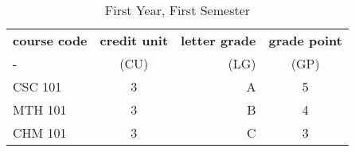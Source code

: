 \documentclass{article}
\begin{document}
	\begin{table}[h!]
	\begin{center}
	\caption {First Year, First Semester}
	\label{tab:table1}
	\begin{tabular}{l|c|r|c|}
		\textbf{course code} & \textbf{credit unit} & \textbf{letter grade} & \textbf{grade point}\\ 
	- & (CU) & (LG) & (GP) \\
		\hline
		CSC 101 & 3 & A & 5 \\
		MTH 101 & 3 & B & 4\\
		CHM 101 & 3 & C  & 3\\
		
	\end{tabular}
	\end{center}
	\end{table}
	
	
	
\end{document}
